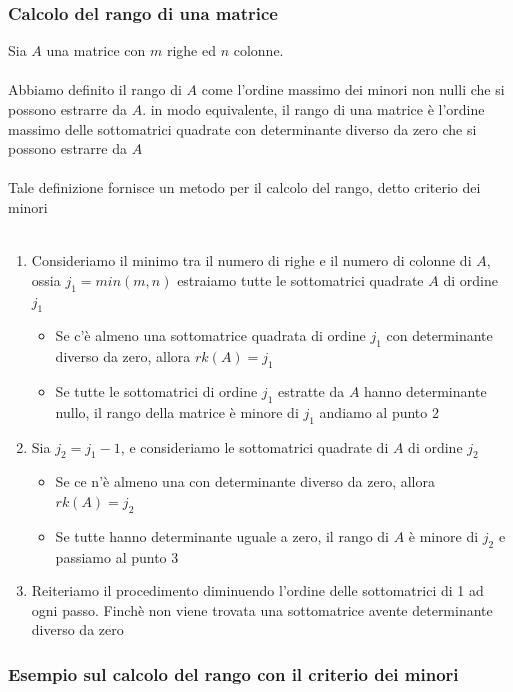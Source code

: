 \documentclass{report}
\begin{document}
\subsubsection{Calcolo del rango di una matrice}
Sia $A$ una matrice con $m$ righe ed $n$ colonne.
\\
\\
Abbiamo definito il rango di $A$ come l'ordine massimo dei minori non nulli che si possono estrarre da $A$. in modo equivalente, il rango di una matrice è l'ordine massimo delle sottomatrici quadrate con determinante diverso da zero che si possono estrarre da $A$
\\
\\
Tale definizione fornisce un metodo per il calcolo del rango, detto criterio dei minori
\\
\\
\begin{enumerate}
  \item{ Consideriamo il minimo tra il numero di righe e il numero di colonne di $A$, ossia $j_1 = min(m,n)$ estraiamo tutte le sottomatrici quadrate $A$ di ordine $j_1$
  \begin{itemize}
    \item Se c'è almeno una sottomatrice quadrata di ordine $j_1$ con determinante diverso da zero, allora $rk(A) = j_1$
    \item Se tutte le sottomatrici di ordine $j_1$ estratte da $A$ hanno determinante nullo, il rango della matrice è minore di $j_1$ andiamo al punto 2
  \end{itemize}}
  \item{Sia $j_2 = j_1 - 1$, e consideriamo le sottomatrici quadrate di $A$ di ordine $j_2$
    \begin{itemize}
      \item Se ce n'è almeno una con determinante diverso da zero, allora $rk(A) = j_2$
      \item Se tutte hanno determinante uguale a zero, il rango di $A$ è minore di $j_2$ e passiamo al punto 3
    \end{itemize}
    }
    \item {Reiteriamo il procedimento diminuendo l'ordine delle sottomatrici di 1 ad ogni passo. Finchè non viene trovata una sottomatrice avente determinante diverso da zero}
\end{enumerate}

\subsubsection{Esempio sul calcolo del rango con il criterio dei minori}
\end{document}
